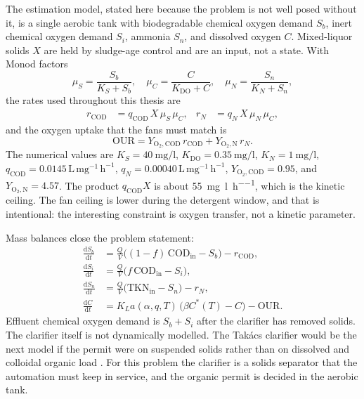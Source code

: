 The estimation model, stated here because the problem is not well posed without it, is a single aerobic tank with biodegradable chemical oxygen demand $S_{b}$, inert chemical oxygen demand $S_{i}$, ammonia $S_{n}$, and dissolved oxygen $C$. Mixed-liquor solids $X$ are held by sludge-age control and are an input, not a state. With Monod factors
\begin{equation}
\label{eq:monod}
\mu_{S}
=
\frac{S_{b}}{K_{S}+S_{b}},
\quad
\mu_{C}
=
\frac{C}{K_{\mathrm{DO}}+C},
\quad
\mu_{N}
=
\frac{S_{n}}{K_{N}+S_{n}},
\end{equation}
the rates used throughout this thesis are
\begin{align}
r_{\mathrm{COD}}
&=
q_{\mathrm{COD}}\,X\,\mu_{S}\,\mu_{C},
&
r_{N}
&=
q_{N}\,X\,\mu_{N}\,\mu_{C},
\label{eq:rates}
\end{align}
and the oxygen uptake that the fans must match is
\begin{equation}
\label{eq:our}
\mathrm{OUR}
=
Y_{\mathrm{O_{2},COD}}\,r_{\mathrm{COD}}
+
Y_{\mathrm{O_{2},N}}\,r_{N}.
\end{equation}
The numerical values are $K_{S}=\SI{40}{\milli\gram\per\litre}$, $K_{\mathrm{DO}}=\SI{0.35}{\milli\gram\per\litre}$, $K_{N}=\SI{1}{\milli\gram\per\litre}$, $q_{\mathrm{COD}}=0.0145\,\mathrm{L\,mg^{-1}\,h^{-1}}$, $q_{N}=0.00040\,\mathrm{L\,mg^{-1}\,h^{-1}}$, $Y_{\mathrm{O_{2},COD}}=0.95$, and $Y_{\mathrm{O_{2},N}}=4.57$. The product $q_{\mathrm{COD}}X$ is about \SI{55}{\milli\gram\per\litre\per\hour}, which is the kinetic ceiling. The fan ceiling is lower during the detergent window, and that is intentional: the interesting constraint is oxygen transfer, not a kinetic parameter.

Mass balances close the problem statement:
\begin{align}
\frac{\mathrm{d}S_{b}}{\mathrm{d}t}
&=
\frac{Q}{V}\bigl((1-f)\,\mathrm{COD}_{\mathrm{in}}-S_{b}\bigr)
-
r_{\mathrm{COD}},
\label{eq:sb}\\
\frac{\mathrm{d}S_{i}}{\mathrm{d}t}
&=
\frac{Q}{V}\bigl(f\,\mathrm{COD}_{\mathrm{in}}-S_{i}\bigr),
\label{eq:si}\\
\frac{\mathrm{d}S_{n}}{\mathrm{d}t}
&=
\frac{Q}{V}\bigl(\mathrm{TKN}_{\mathrm{in}}-S_{n}\bigr)
-
r_{N},
\label{eq:sn}\\
\frac{\mathrm{d}C}{\mathrm{d}t}
&=
K_La(\alpha,q,T)\,
\bigl(\beta C^{*}(T)-C\bigr)
-
\mathrm{OUR}.
\label{eq:do-bal}
\end{align}
Effluent chemical oxygen demand is $S_{b}+S_{i}$ after the clarifier has removed solids. The clarifier itself is not dynamically modelled. The Tak{\'a}cs clarifier would be the next model if the permit were on suspended solids rather than on dissolved and colloidal organic load \cite{takacs1991}. For this problem the clarifier is a solids separator that the automation must keep in service, and the organic permit is decided in the aerobic tank.

